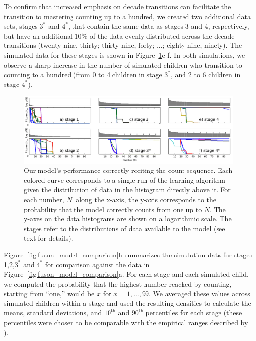 \documentclass[10pt,letterpaper]{article}
\begin{document}
To confirm that increased emphasis on decade transitions can
facilitate the transition to mastering counting up to a hundred, we
created two additional data sets, stages $3^*$ and $4^*$, that contain the
same data as stages 3 and 4, respectively, but have an additional
$10\%$ of the data evenly distributed across the decade transitions
(twenty nine, thirty; thirty nine, forty; ...; eighty nine,
ninety). The simulated data for these stages is shown in
Figure~\ref{fig:counting_grid}e-f. In both simulations, we observe a
sharp increase in the number of simulated children who transition to
counting to a hundred (from 0 to 4 children in stage $3^*$, and 2 to
6 children in stage $4^*$).

\begin{figure}[t]
  \includegraphics[width=\linewidth]{figures/counting_grid2}
  \caption{Our model's performance correctly reciting the count
    sequence. Each colored curve corresponds to a single run of the learning
    algorithm given the distribution of data in the histogram directly
    above it. For each number, $N$, along the x-axis, the y-axis
    corresponds to the probability that the model correctly counts
    from one up to $N$. The y-axes on the data histograms are shown on
    a logarithmic scale. The stages refer to the distributions of data
    available to the model (see text for details).
  }\label{fig:counting_grid}
\end{figure}


Figure~\ref{fig:fuson_model_comparison}b summarizes the simulation
data for stages 1,2,$3^*$ and $4^*$ for comparison against the
\citeauthor{FusRicBriar1982} data in
Figure~\ref{fig:fuson_model_comparison}a. For each stage and each
simulated child, we computed the probability that the highest number
reached by counting, starting from ``one,'' would be $x$ for
$x=1, \dots, 99$. We averaged these values across simulated children
within a stage and used the resulting densities to calculate the
means, standard deviations, and $10^{\text{th}}$ and $90^{\text{th}}$
percentiles for each stage (these percentiles were chosen to be
comparable with the empirical ranges described by
\citeauthor{FusRicBriar1982}).
\end{document}
